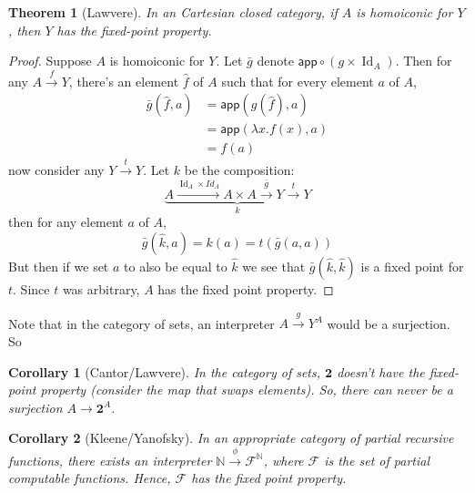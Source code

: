 \documentclass{article}
\newtheorem{theorem}{Theorem}
\newtheorem{corrolary}{Corollary}
\DeclareMathOperator{\Id}{Id}
\begin{document}
\begin{theorem}[Lawvere] In an Cartesian closed category, if $A$ is homoiconic
  for $Y$, then $Y$ has the fixed-point property.
\end{theorem}
\begin{proof}
  Suppose $A$ is homoiconic for $Y$. Let $\bar{g}$ denote $\mathsf{app} \circ
  (g\times \Id_A)$. Then for any $A\xrightarrow{f}Y$, there's an element
  $\hat{f}$ of $A$ such that for every element $a$ of $A$, 
  \begin{align*}
    \bar{g}(\hat{f}, a) &= \mathsf{app}(g(\hat{f}),a) \\
                        &= \mathsf{app}(\lambda x. f(x),a)\\
                        &= f(a)
  \end{align*}
  now consider any $Y\xrightarrow{t}Y$. Let $k$ be the composition:
  $$\underbrace{A\xrightarrow{\Id_A\times Id_A} A\times A\xrightarrow{\bar{g}}Y\xrightarrow{t}Y}_k$$
  then for any element $a$ of $A$,
  $$\bar{g}(\hat{k}, a) = k(a) = t(\bar{g}(a,a))$$
  But then if we set $a$ to also be equal to $\hat{k}$ we see that $\bar{g}(\hat{k},\hat{k})$ is a fixed point for $t$. Since $t$ was arbitrary, $A$ has the fixed point property.
\end{proof}

Note that in the category of sets, an interpreter $A\xrightarrow{g}Y^A$ would be
a surjection. So

\begin{corrolary}[Cantor/Lawvere] In the category of sets, $\mathbf{2}$ doesn't have the
  fixed-point property (consider the map that swaps elements). So, there can
  never be a surjection $A\rightarrow \mathbf{2}^A$.
\end{corrolary}

\begin{corrolary}[Kleene/Yanofsky] In an appropriate category of partial recursive functions, there
  exists an interpreter $\mathbb{N}\xrightarrow{\phi} \mathcal{F}^\mathbb{N}$,
  where $\mathcal{F}$ is the set of partial computable functions. Hence,
  $\mathcal{F}$ has the fixed point property.
\end{corrolary}
\end{document}
